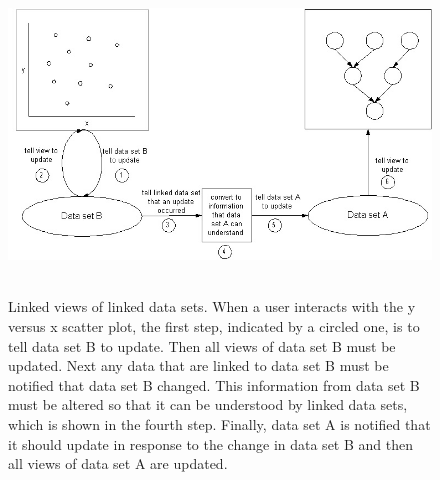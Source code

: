\documentclass{article}[11pt]
\newcommand{\Robject}[1]{{\texttt{#1}}}
\begin{document}

\begin{figure}[ht]
  \begin{center}
    \includegraphics[height=3.3in, width=5in]{firstMessagePassing.jpg}
    \caption{ Linked views of linked data sets.  When a user interacts with
      the y versus x scatter plot, the first step, indicated by a circled one,
      is to tell data set B to update.  Then all views of data set B must be
      updated.  Next any data that are linked to data set B must be notified
      that data set B changed.  This information from data set B must be
      altered so that it can be understood by linked data sets, which is shown
      in the fourth step.  Finally, data set A is notified that it should
      update in response to the change in data set B and then all views of
      data set A are updated. }
    \label{Fig:firstMP}
  \end{center}
\end{figure}


\end{document}
